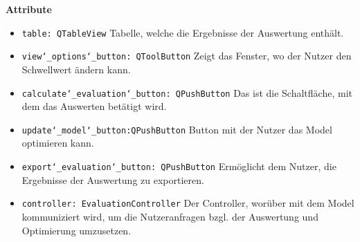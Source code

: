 \documentclass{article}
\begin{document}
\textbf{{Attribute}}
\begin{itemize}
\item \texttt{table: QTableView} \newline Tabelle, welche die Ergebnisse der Auswertung enthält.
\item \texttt{view\char`_options\char`_button: QToolButton} \newline Zeigt das Fenster, wo der Nutzer den Schwellwert ändern kann.
\item \texttt{calculate\char`_evaluation\char`_button:  QPushButton} \newline Das ist die Schaltfläche, mit dem das Auswerten betätigt wird.
\item \texttt{update\char`_model\char`_button:QPushButton} \newline  Button mit der Nutzer das Model optimieren kann.
\item \texttt{export\char`_evaluation\char`_button:  QPushButton} \newline Ermöglicht dem Nutzer, die Ergebnisse der Auswertung zu exportieren.
\item \texttt{controller: EvaluationController} \newline Der Controller, worüber mit dem Model kommuniziert wird, um die Nutzeranfragen bzgl. der Auswertung und Optimierung umzusetzen.
\end{itemize}
\end{document}
